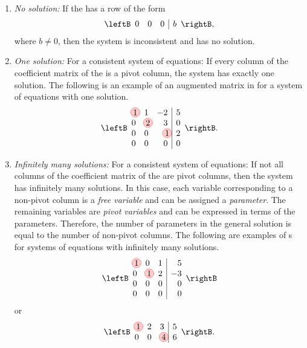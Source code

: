 \begin{enumerate}
\item {\em No solution:} If the {\ef} has a row of the form
  \[
    \leftB
    \begin{array}{rrr|r}
      0 & 0 & 0 & b
    \end{array}
    \rightB,
  \]
  where $b\neq 0$, then the system is inconsistent and has no
  solution.

\item {\em One solution:} For a consistent system of equations: If
  every column of the coefficient matrix of the {\ef} is a pivot
  column, the system has exactly one solution. The following is an
  example of an augmented matrix in {\ef} for a system of equations
  with one solution.
  \begin{equation*}
    \leftB
    \begin{array}{rrr|r}
      \circled{1} & 1 & -2 & 5 \\
      0 & \circled{2} & 3 & 0 \\ 
      0 & 0 & \circled{1} & 2 \\
      0 & 0 & 0 & 0 
    \end{array}
    \rightB.
  \end{equation*}

\item {\em Infinitely many solutions:} For a consistent system of
  equations: If not all columns of the coefficient matrix of the {\ef}
  are pivot columns, then the system has infinitely many solutions.
  In this case, each variable corresponding to a non-pivot column is a
  {\em free variable} and
  can be assigned a {\em parameter}. The remaining
  variables are
  {\em pivot variables}
  and can be expressed in terms of the parameters. Therefore, the
  number of parameters in the general solution is equal to the number
  of non-pivot columns.
  The following are examples of {\ef}s for systems of equations with
  infinitely many solutions.
  \begin{equation*}
    \leftB
    \begin{array}{rrr|r}
      \circled{1} & 0 & 1 & 5 \\
      0 & \circled{1} & 2 & -3 \\ 
      0 & 0 & 0 & 0 \\
      0 & 0 & 0 & 0 
    \end{array}
    \rightB
  \end{equation*}
  or
  \begin{equation*}
    \leftB
    \begin{array}{rrr|r}
      \circled{1} & 2 & 3 & 5 \\
      0 & 0 & \circled{4} & 6
    \end{array}
    \rightB.
\end{equation*}
\end{enumerate}

